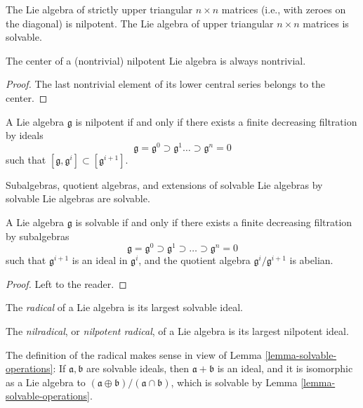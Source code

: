 \begin{example}
 \label{example-nilpotent-solvable}
The Lie algebra of strictly upper triangular $n\times n$ matrices (i.e., with zeroes on the diagonal) is nilpotent. The Lie algebra of upper triangular $n\times n$ matrices is solvable.
\end{example}

\begin{lemma}
 \label{lemma-nilpotent-center}
 The center of a (nontrivial) nilpotent Lie algebra is always nontrivial.
\end{lemma}
\begin{proof}
 The last nontrivial element of its lower central series belongs to the center.
\end{proof}




\begin{lemma}
 \label{lemma-solvable-operations}
A Lie algebra $\mathfrak g$ is nilpotent if and only if there exists a finite decreasing filtration by ideals 
$$ \mathfrak g = \mathfrak g^0 \supset \mathfrak g^1 \dots \supset \mathfrak g^n=0$$
such that $[\mathfrak g, \mathfrak g^i]\subset [\mathfrak g^{i+1}]$.
 
 
 Subalgebras, quotient algebras, and extensions of solvable Lie algebras by solvable Lie algebras are solvable.
  
   A Lie algebra $\mathfrak g$ is solvable if and only if there exists a finite decreasing filtration by subalgebras
   $$ \mathfrak g = \mathfrak g^0 \supset \mathfrak g^1 \supset \dots \supset \mathfrak g^n =0$$
   such that $\mathfrak g^{i+1}$ is an ideal in $\mathfrak g^i$, and the quotient algebra $\mathfrak g^i/\mathfrak g^{i+1}$ is abelian.
\end{lemma}

\begin{proof}
 Left to the reader.
\end{proof}



\begin{definition}
 \label{definition-radical}
The {\it radical} of a Lie algebra is its largest solvable ideal.

The {\it nilradical}, or {\it nilpotent radical}, of a Lie algebra is its largest nilpotent ideal.
\end{definition}

The definition of the radical makes sense in view of Lemma \ref{lemma-solvable-operations}: If $\mathfrak a, \mathfrak b$ are solvable ideals, then $\mathfrak a + \mathfrak b$ is an ideal, and it is isomorphic as a Lie algebra to $(\mathfrak a \oplus \mathfrak b)/(\mathfrak a\cap \mathfrak b)$, which is solvable by Lemma \ref{lemma-solvable-operations}.

